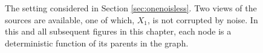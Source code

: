\begin{figure}[t!]
	\centering
	\caption[Two-view ICA with one noiseless view]{The setting considered in Section \ref{sec:onenoisless}. Two views of the sources are available, one of which, $X_1$, is not corrupted by noise. In this and all subsequent figures in this chapter, each node is a deterministic function of its parents in the graph.
	}
	\label{fig:generalized_hsr_basic}
\end{figure}

\medskip

